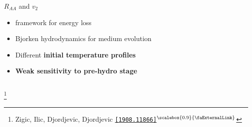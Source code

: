 \documentclass[aspectratio=169,11pt,usenames,dvipsnames]{beamer}
\renewcommand{\thefootnote}{\color{customblue}\faPaperPlaneO}
\newcommand\blfootnote[1]{%
  \begingroup
  \renewcommand\thefootnote{}\footnote{#1}%
  \addtocounter{footnote}{-1}%
  \endgroup
}
\begin{document}
\begin{frame}[t]
\begin{columns}[onlytextwidth,t]
\begin{center}
            {\Large\color{palgold} $R_{AA}$ and $v_2$  \\[10pt]}
            \footnotesize
                \begin{itemize}
                    \item {\color{lightgray}{\bfseries DREENA} framework for energy loss}
                    \item {\color{lightgray}Bjorken hydrodynamics for medium evolution}
                    \item {\color{lightgray}Different {\bfseries initial temperature profiles}}\\[15pt]
                    \item {\color{destacado}\bfseries\normalsize{Weak sensitivity to pre-hydro stage}}
                \end{itemize}
        \end{center}
    \end{columns}
    \blfootnote{\scriptsize Zigic, Ilic, Djordjevic, Djordjevic \href{https://arxiv.org/abs/1908.11866}{\color{palgold}\texttt{[1908.11866]}$^\text{\scalebox{0.9}{\faExternalLink}}$}}
\end{frame}

\end{document}
